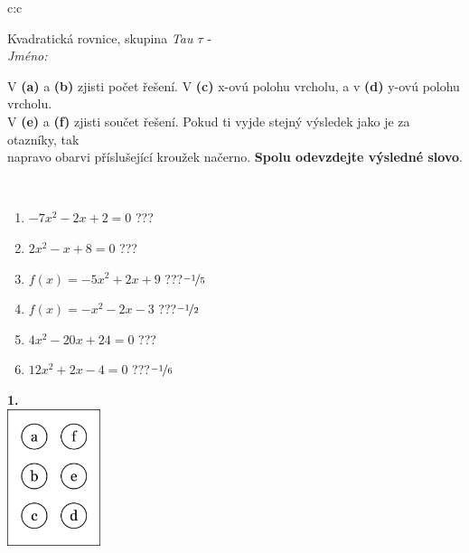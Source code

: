 \documentclass[10pt]{report}
\begin{document}
\begin{tabular}{c:c}
\begin{minipage}[c][104.5mm][t]{0.5\linewidth}
\begin{center}
\vspace{7mm}
{\huge Kvadratická rovnice, skupina \textit{Tau $\tau$} -}\\[5mm]
\textit{Jméno:}\phantom{xxxxxxxxxxxxxxxxxxxxxxxxxxxxxxxxxxxxxxxxxxxxxxxxxxxxxxxxxxxxxxxxx}\\[5mm]
\begin{minipage}{0.95\linewidth}
\begin{center}
V \textbf{(a)} a \textbf{(b)} zjisti počet řešení. V \textbf{(c)} x-ovú polohu vrcholu, a v \textbf{(d)} y-ovú polohu vrcholu.\\V \textbf{(e)} a \textbf{(f)} zjisti součet řešení. Pokud ti vyjde stejný výsledek jako je za otazníky, tak\\napravo obarvi příslušející kroužek načerno. \textbf{Spolu odevzdejte výsledné slovo}.
\end{center}
\end{minipage}
\\[1mm]
\begin{minipage}{0.79\linewidth}
\begin{center}
\begin{varwidth}{\linewidth}
\begin{enumerate}
\Large
\item $-7x^2-2x+2=0$\quad \dotfill\; ???\;\dotfill {}
\item $2x^2-x+8=0$\quad \dotfill\; ???\;\dotfill {}
\item $f(x)=-5x^2+2x+9$\quad \dotfill\; ???\;\dotfill \quad $\nicefrac{-1}{5}$
\item $f(x)=-x^2-2x-3$\quad \dotfill\; ???\;\dotfill \quad $\nicefrac{-1}{2}$
\item $4x^2-20x+24=0$\quad \dotfill\; ???\;\dotfill {}
\item $12x^2+2x-4=0$\quad \dotfill\; ???\;\dotfill \quad $\nicefrac{-1}{6}$
\end{enumerate}
\end{varwidth}
\end{center}
\end{minipage}
\begin{minipage}{0.20\linewidth}
\begin{center}
{\Huge\bfseries 1.} \\[2mm]
\includegraphics[height=40mm]{../images/braille.png}

\end{center}
\end{minipage}
\end{center}
\end{minipage}
\end{tabular}
\end{document}
